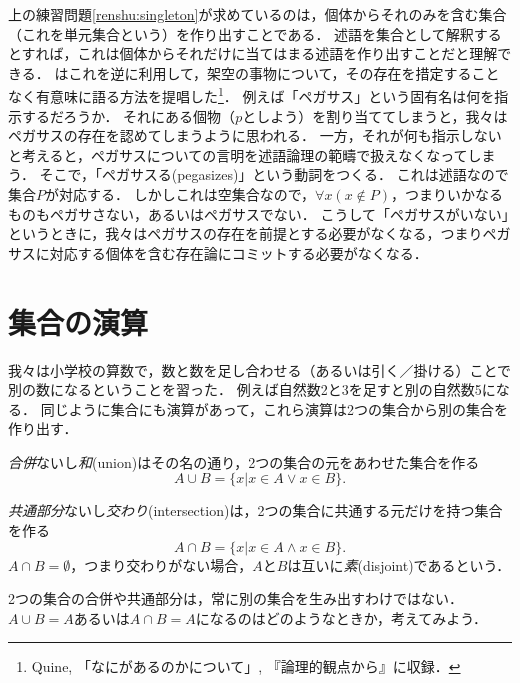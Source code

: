 \documentclass[11pt,a4paper]{jsarticle}
\begin{document}
\begin{rei}{}{}
上の練習問題\ref{renshu:singleton}が求めているのは，個体からそれのみを含む集合（これを単元集合という）を作り出すことである．
述語を集合として解釈するとすれば，これは個体からそれだけに当てはまる述語を作り出すことだと理解できる．
\cite{Quine1953-yy}はこれを逆に利用して，架空の事物について，その存在を措定することなく有意味に語る方法を提唱した\footnote{Quine, 「なにがあるのかについて」, 『論理的観点から』に収録．}．
例えば「ペガサス」という固有名は何を指示するだろうか．
それにある個物（$p$としよう）を割り当ててしまうと，我々はペガサスの存在を認めてしまうように思われる．
一方，それが何も指示しないと考えると，ペガサスについての言明を述語論理の範疇で扱えなくなってしまう．
そこで，「ペガサスる(pegasizes)」という動詞をつくる．
これは述語なので集合$P$が対応する．
しかしこれは空集合なので，$\forall x (x \not\in P)$，つまりいかなるものもペガサさない，あるいはペガサスでない．
こうして「ペガサスがいない」というときに，我々はペガサスの存在を前提とする必要がなくなる，つまりペガサスに対応する個体を含む存在論にコミットする必要がなくなる．
\end{rei}{}{}


\section{集合の演算}
\label{sec:setoperation}
我々は小学校の算数で，数と数を足し合わせる（あるいは引く／掛ける）ことで別の数になるということを習った．
例えば自然数2と3を足すと別の自然数5になる．
同じように集合にも演算があって，これら演算は2つの集合から別の集合を作り出す．

\emph{合併}ないし\emph{和}(union)はその名の通り，2つの集合の元をあわせた集合を作る
\[
 A \cup B = \{ x | x \in A \vee x \in B\} .
\]


\emph{共通部分}ないし\emph{交わり}(intersection)は，2つの集合に共通する元だけを持つ集合を作る
\[
 A \cap B = \{ x | x \in A \wedge x \in B\}.
\]
$A \cap B = \emptyset$，つまり交わりがない場合，$A$と$B$は互いに\emph{素}(disjoint)であるという．

\begin{attn}
 2つの集合の合併や共通部分は，常に別の集合を生み出すわけではない．$A \cup B = A$あるいは$A \cap B = A$になるのはどのようなときか，考えてみよう．
\end{attn}
\end{document}
